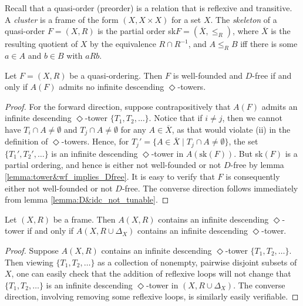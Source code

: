 \documentclass[submission]{eptcs}
\begin{document}
Recall that a quasi-order (preorder) is a relation that is reflexive and transitive.
A \textit{cluster} is a frame of the form $(X,X\times X)$ for a set $X$.
The \textit{skeleton} of a quasi-order $F=(X,R)$ is the partial order sk$F=(\overline{X},\leq_R)$,
where $\overline{X}$ is the resulting quotient of $X$ by the equivalence $R \cap R^{-1}$, and ${A}\leq_R{B}$ iff there is some $a \in A$ and $b\in B$ with $aRb$.

\begin{lemma} \label{lemma:quasi-ordeing_classification}
    Let $F=(X,R)$ be a quasi-ordering. Then $F$ is well-founded and $D$-free if and only if $A(F)$ admits no infinite descending $\Diamond$-towers. 
\end{lemma}

\begin{proof}
    For the forward direction, suppose contrapositively that $A(F)$ admits an infinite descending $\Diamond$-tower $\{T_1,T_2,\dots\}$. Notice that if $i\neq j$, then we cannot have $T_i\cap A\neq \emptyset$ and $T_j \cap A\neq \emptyset$ for any $A\in \overline{X}$, as that would violate (ii) in the definition of $\Diamond$-towers. 
    Hence, for $T_j'=\{A \in \overline{X} \mid T_j \cap A \neq \emptyset\}$, the set $\{T_1',T_2',\dots\}$ is an infinite descending $\Diamond$-tower in $A(\text{sk}(F))$.
    But sk$(F)$ is a partial ordering, and hence is either not well-founded or not $D$-free by lemma \ref{lemma:tower&wf_implies_Dfree}.
    It is easy to verify that $F$ is consequently either not well-founded or not $D$-free.
    The converse direction follows immediately from lemma \ref{lemma:D&idc_not_tunable}.
\end{proof}

\begin{lemma} \label{lemma:reflexivity_doesn't_matter}
    Let $(X,R)$ be a frame. Then $A(X,R)$ contains an infinite descending $\Diamond$-tower if and only if $A(X,R\cup \Delta_X)$ contains an infinite descending $\Diamond$-tower.
\end{lemma}

\begin{proof}
    Suppose $A(X,R)$ contains an infinite descending $\Diamond$-tower $\{T_1,T_2,\dots\}$.
    Then viewing $\{T_1,T_2,\dots\}$ as a collection of nonempty, pairwise disjoint subsets of $X$, one can easily check that the addition of reflexive loops will not change that $\{T_1,T_2,\dots\}$ is an infinite descending $\Diamond$-tower in $(X,R\cup \Delta_X)$. 
    The converse direction, involving removing some reflexive loops, is similarly easily verifiable.
\end{proof}
\end{document}
